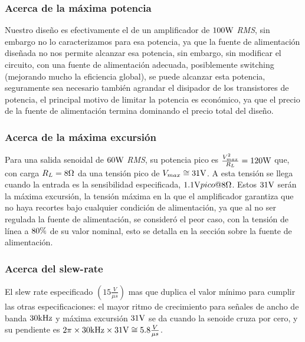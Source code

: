 \subsubsection{Acerca de la máxima potencia}
 
 \begin{sloppypar}
 
Nuestro diseño es efectivamente el de un amplificador de ${100 \si[per-mode=symbol]{\watt}}$ \textit{RMS}, sin embargo no lo caracterizamos para esa potencia, ya que la fuente de alimentación diseñada no nos permite alcanzar esa potencia, sin embargo, sin modificar el circuito, con una fuente de alimentación adecuada, posiblemente switching (mejorando mucho la eficiencia global), se puede alcanzar esta potencia, seguramente sea necesario también agrandar el disipador de los transistores de potencia, el principal motivo de limitar la potencia es económico, ya que el precio de la fuente de alimentación termina dominando el precio total del diseño.

\end{sloppypar}

 
\subsubsection{Acerca de la máxima excursión}
 
 \begin{sloppypar}
 
Para una salida senoidal de $60\si[per-mode=symbol]{\watt}$ \textit{RMS}, su potencia pico es ${\frac{V_{max}^2}{R_L} = 120\si[per-mode=symbol]{\watt}}$ que, con carga ${R_L=8\si[per-mode=symbol]{\ohm}}$ da una tensión pico de ${V_{max} \cong 31 \si[per-mode=symbol]{\volt}}$. A esta tensión se llega cuando la entrada es la sensibilidad especificada, ${1.1\si[per-mode=symbol]{\volt} pico @8\si[per-mode=symbol]{\ohm}}$. Estos ${31 \si[per-mode=symbol]{\volt}}$ serán la máxima excursión, la tensión máxima en la que el amplificador garantiza que no haya recortes bajo cualquier condición de alimentación, ya que al no ser regulada la fuente de alimentación, se consideró el peor caso, con la tensión de línea a ${80\si[per-mode=symbol]{\percent}}$ de su valor nominal, esto se detalla en la sección sobre la fuente de alimentación.

\end{sloppypar}


\subsubsection{Acerca del slew-rate}

\begin{sloppypar}

El slew rate especificado ${\left(15\frac{V}{\mu s}\right)}$ mas que duplica el valor mínimo para cumplir las otras especificaciones: el mayor ritmo de crecimiento para señales de ancho de banda $30\si[per-mode=symbol]{\kilo\hertz}$ y máxima excursión $31\si[per-mode=symbol]{\volt}$ se da cuando la senoide cruza por cero, y su pendiente es ${2 \pi \times 30\si[per-mode=symbol]{\kilo\hertz}\times 31\si[per-mode=symbol]{\volt} \cong 5.8\frac{V}{\mu s}}$. 

\end{sloppypar}